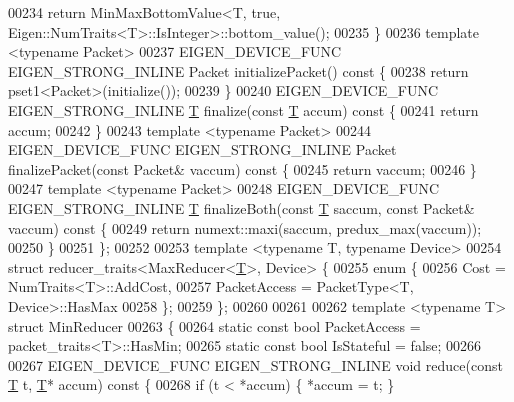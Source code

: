 \begin{DoxyCode}
00234     \textcolor{keywordflow}{return} MinMaxBottomValue<T, true, Eigen::NumTraits<T>::IsInteger>::bottom\_value();
00235   \}
00236   \textcolor{keyword}{template} <\textcolor{keyword}{typename} Packet>
00237   EIGEN\_DEVICE\_FUNC EIGEN\_STRONG\_INLINE Packet initializePacket()\textcolor{keyword}{ const }\{
00238     \textcolor{keywordflow}{return} pset1<Packet>(initialize());
00239   \}
00240   EIGEN\_DEVICE\_FUNC EIGEN\_STRONG\_INLINE \hyperlink{group___sparse_core___module_class_eigen_1_1_triplet}{T} finalize(\textcolor{keyword}{const} \hyperlink{group___sparse_core___module_class_eigen_1_1_triplet}{T} accum)\textcolor{keyword}{ const }\{
00241     \textcolor{keywordflow}{return} accum;
00242   \}
00243   \textcolor{keyword}{template} <\textcolor{keyword}{typename} Packet>
00244   EIGEN\_DEVICE\_FUNC EIGEN\_STRONG\_INLINE Packet finalizePacket(\textcolor{keyword}{const} Packet& vaccum)\textcolor{keyword}{ const }\{
00245     \textcolor{keywordflow}{return} vaccum;
00246   \}
00247   \textcolor{keyword}{template} <\textcolor{keyword}{typename} Packet>
00248   EIGEN\_DEVICE\_FUNC EIGEN\_STRONG\_INLINE \hyperlink{group___sparse_core___module_class_eigen_1_1_triplet}{T} finalizeBoth(\textcolor{keyword}{const} \hyperlink{group___sparse_core___module_class_eigen_1_1_triplet}{T} saccum, \textcolor{keyword}{const} Packet& vaccum)\textcolor{keyword}{ const }\{
00249     \textcolor{keywordflow}{return} numext::maxi(saccum, predux\_max(vaccum));
00250   \}
00251 \};
00252 
00253 \textcolor{keyword}{template} <\textcolor{keyword}{typename} T, \textcolor{keyword}{typename} Device>
00254 \textcolor{keyword}{struct }reducer\_traits<MaxReducer<\hyperlink{group___sparse_core___module_class_eigen_1_1_triplet}{T}>, Device> \{
00255   \textcolor{keyword}{enum} \{
00256     Cost = NumTraits<T>::AddCost,
00257     PacketAccess = PacketType<T, Device>::HasMax
00258   \};
00259 \};
00260 
00261 
00262 \textcolor{keyword}{template} <\textcolor{keyword}{typename} T> \textcolor{keyword}{struct }MinReducer
00263 \{
00264   \textcolor{keyword}{static} \textcolor{keyword}{const} \textcolor{keywordtype}{bool} PacketAccess = packet\_traits<T>::HasMin;
00265   \textcolor{keyword}{static} \textcolor{keyword}{const} \textcolor{keywordtype}{bool} IsStateful = \textcolor{keyword}{false};
00266 
00267   EIGEN\_DEVICE\_FUNC EIGEN\_STRONG\_INLINE \textcolor{keywordtype}{void} reduce(\textcolor{keyword}{const} \hyperlink{group___sparse_core___module_class_eigen_1_1_triplet}{T} t, \hyperlink{group___sparse_core___module_class_eigen_1_1_triplet}{T}* accum)\textcolor{keyword}{ const }\{
00268     \textcolor{keywordflow}{if} (t < *accum) \{ *accum = t; \}

\end{DoxyCode}
